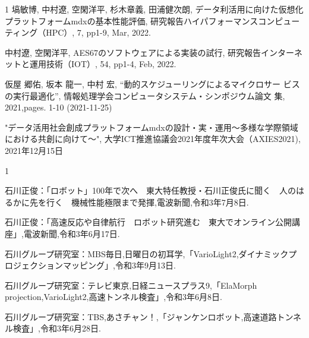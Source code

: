 \begin{発表}{1}
塙敏博, 中村遼, 空閑洋平, 杉木章義, 田浦健次朗, データ利活用に向けた仮想化プラットフォームmdxの基本性能評価, 研究報告ハイパフォーマンスコンピューティング（HPC）, 7, pp1-9, Mar, 2022.

中村遼, 空閑洋平, AES67のソフトウェアによる実装の試行, 研究報告インターネットと運用技術（IOT）, 54, pp1-4, Feb, 2022.

仮屋 郷佑, 坂本 龍一, 中村 宏, ``動的スケジューリングによるマイクロサー
ビスの実行最適化'', 情報処理学会コンピュータシステム・シンポジウム論文
集, 2021,pages. 1-10 (2021-11-25)


"データ活用社会創成プラットフォームmdxの設計・実・運用〜多様な学際領域における共創に向けて～", 大学ICT推進協議会2021年度年次大会（AXIES2021), 2021年12月15日
\end{発表}




\begin{報道}{1}

石川正俊：「ロボット」100年で次へ　東大特任教授・石川正俊氏に聞く　人のはるかに先を行く　機械性能極限まで発揮,電波新聞,令和3年7月8日.

石川正俊：「高速反応や自律航行　ロボット研究進む　東大でオンライン公開講座」,電波新聞,令和3年6月17日.

石川グループ研究室：MBS毎日,日曜日の初耳学,「VarioLight2,ダイナミックプロジェクションマッピング」,令和3年9月13日.

石川グループ研究室：テレビ東京,日経ニュースプラス9,「ElaMorph projection,VarioLight2,高速トンネル検査」,令和3年6月8日.

石川グループ研究室：TBS,あさチャン！,「ジャンケンロボット,高速道路トンネル検査」,令和3年6月28日.


\end{報道}
